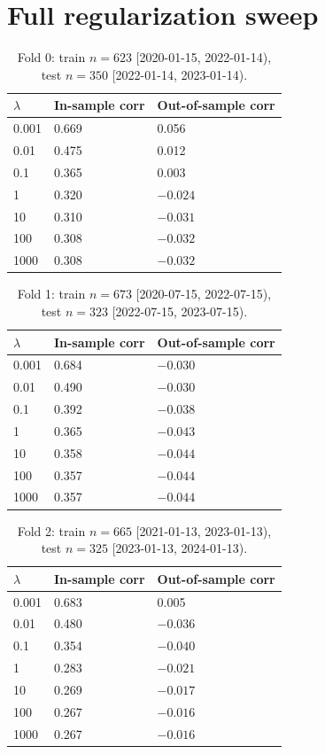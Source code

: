 \documentclass[11pt]{article}
\begin{document}
\section{Full regularization sweep}
\label{app:regsweep}

\begin{table}[H]
\centering
\caption{Fold 0: train $n=623$ [2020-01-15, 2022-01-14), test $n=350$ [2022-01-14, 2023-01-14).}
\begin{tabular}{@{}lll@{}}
\toprule
$\lambda$ & In-sample corr & Out-of-sample corr \\
\midrule
0.001 & 0.669 & 0.056 \\
0.01  & 0.475 & 0.012 \\
0.1   & 0.365 & 0.003 \\
1     & 0.320 & $-0.024$ \\
10    & 0.310 & $-0.031$ \\
100   & 0.308 & $-0.032$ \\
1000  & 0.308 & $-0.032$ \\
\bottomrule
\end{tabular}
\end{table}

\begin{table}[H]
\centering
\caption{Fold 1: train $n=673$ [2020-07-15, 2022-07-15), test $n=323$ [2022-07-15, 2023-07-15).}
\begin{tabular}{@{}lll@{}}
\toprule
$\lambda$ & In-sample corr & Out-of-sample corr \\
\midrule
0.001 & 0.684 & $-0.030$ \\
0.01  & 0.490 & $-0.030$ \\
0.1   & 0.392 & $-0.038$ \\
1     & 0.365 & $-0.043$ \\
10    & 0.358 & $-0.044$ \\
100   & 0.357 & $-0.044$ \\
1000  & 0.357 & $-0.044$ \\
\bottomrule
\end{tabular}
\end{table}

\begin{table}[H]
\centering
\caption{Fold 2: train $n=665$ [2021-01-13, 2023-01-13), test $n=325$ [2023-01-13, 2024-01-13).}
\begin{tabular}{@{}lll@{}}
\toprule
$\lambda$ & In-sample corr & Out-of-sample corr \\
\midrule
0.001 & 0.683 & 0.005 \\
0.01  & 0.480 & $-0.036$ \\
0.1   & 0.354 & $-0.040$ \\
1     & 0.283 & $-0.021$ \\
10    & 0.269 & $-0.017$ \\
100   & 0.267 & $-0.016$ \\
1000  & 0.267 & $-0.016$ \\
\bottomrule
\end{tabular}
\end{table}
\end{document}
